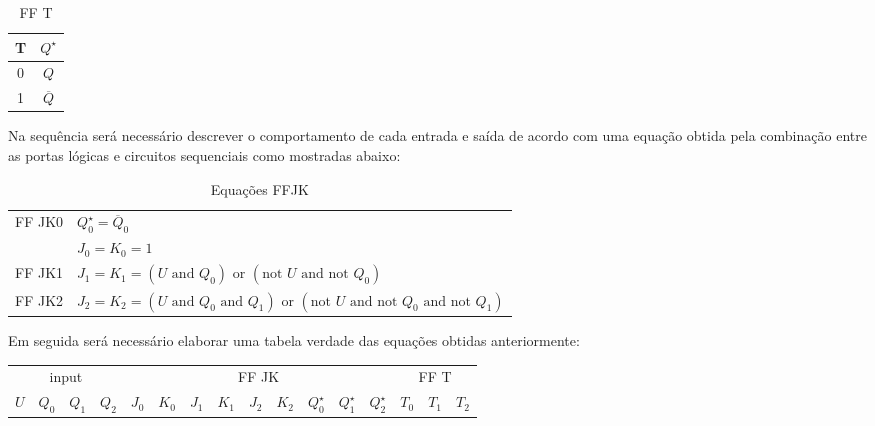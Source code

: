 \documentclass{article}
\begin{document}
\begin{resolution}
\begin{center}
\begin{minipage}{0.3\linewidth}
\begin{table}[H]
            \end{table}
        \end{minipage}
        \begin{minipage}{0.3\linewidth}
            \begin{table}[H]
            \centering\begin{tabular}[]{c|c}
                T & $Q^\star$\\\hline
                0 & $Q$\\
                1 & $\overline{Q}$\\\hline
            \end{tabular}\caption{FF T}
            \end{table}
        \end{minipage}
        \end{center}
        Na sequência será necessário descrever o comportamento de cada entrada e saída de acordo com uma equação obtida pela combinação entre as portas lógicas e circuitos sequenciais como mostradas abaixo:
        \begin{table}[H]
            \centering\begin{tabular}[]{cl}\hline
                \multirow{2}{*}{FF JK0} & $Q_0^\star = \overline{Q}_0$\\
                                        & $J_0 = K_0 = 1$\\\hline
                FF JK1                  & $J_1 = K_1 = (U \text{ and } Q_0) \text{ or } (\text{not } U \text{ and } \text{not } Q_0)$\\\hline
                FF JK2                  & $J_2 = K_2 = (U \text{ and } Q_0 \text{ and } Q_1) \text{ or } (\text{not } U \text{ and } \text{not } Q_0 \text{ and } \text{not } Q_1)$\\\hline
            \end{tabular}\caption{Equações FFJK}
        \end{table}
        Em seguida será necessário elaborar uma tabela verdade das equações obtidas anteriormente:
        \begin{table}[H]
            \centering\begin{tabular}[]{cccc|cc|cc|cc|ccc|ccc}
                \multicolumn{4}{c|}{input}& \multicolumn{9}{c|}{FF JK}                                & \multicolumn{3}{c}{FF T}\\
                $U$&$Q_0$&$Q_1$&$Q_2$     &$J_0$&$K_0$&$J_1$&$K_1$&$J_2$&$K_2$&$Q_0^\star$&$Q_1^\star$&$Q_2^\star$&$T_0$&$T_1$&$T_2$ \\\hline

\end{tabular}
\end{table}
\end{resolution}
\end{document}
